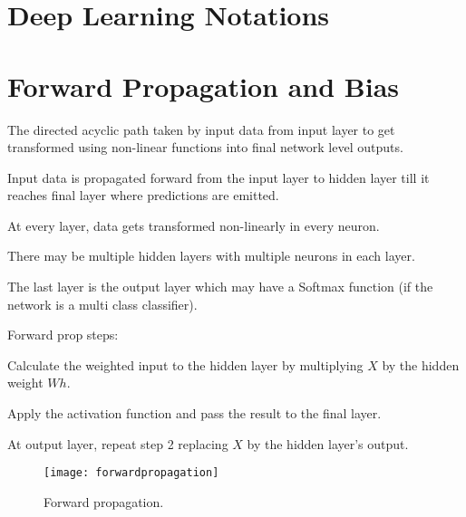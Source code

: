 	\section{Deep Learning Notations}

	\section{Forward Propagation and Bias}
	\begin{bulletedlist}
		\item The directed acyclic path taken by input data from input layer to get transformed using non-linear functions into final network level outputs.
		\item Input data is propagated forward from the input layer to hidden layer till it reaches final layer where predictions are emitted.
		\item At every layer, data gets transformed non-linearly in every neuron.
		\item There may be multiple hidden layers with multiple neurons in each layer.
		\item The last layer is the output layer which may have a Softmax function (if the network is a multi class classifier).
		\item Forward prop steps:
		\begin{numberedlist}
			\item Calculate the weighted input to the hidden layer by multiplying $X$ by the hidden weight $Wh$.
			\item Apply the activation function and pass the result to the final layer.
			\item At output layer, repeat step 2 replacing $X$ by the hidden layer's output.
		\end{numberedlist}
	\end{bulletedlist}
 	\begin{figure}[htb]
		\centering
		\texttt{[image: forwardpropagation]}
		\caption[Forward propagation]{Forward propagation.}
		\label{fig:forwardpropagation}
	\end{figure}

